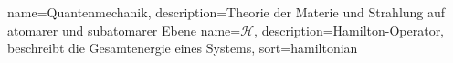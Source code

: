
{
    name={Quantenmechanik},
    description={Theorie der Materie und Strahlung auf atomarer und subatomarer Ebene}
}
{
    name={\ensuremath{\mathcal{H}}},
    description={Hamilton-Operator, beschreibt die Gesamtenergie eines Systems},
    sort={hamiltonian}
}
